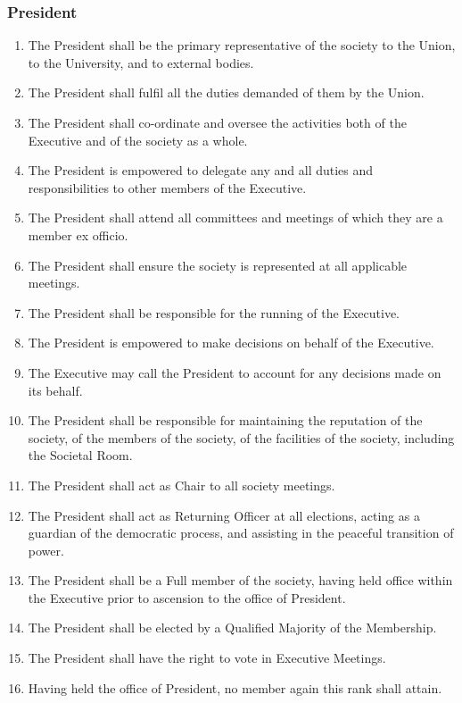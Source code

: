 \documentclass{scrartcl}
\begin{document}
            \subsubsection{President}
                \label{executive--positions--president}
                \begin{enumerate}
                    \item The President shall be the primary representative of the society to the Union, to the University, and to external bodies.
                    \item The President shall fulfil all the duties demanded of them by the Union.
                    \item The President shall co-ordinate and oversee the activities both of the Executive and of the society as a whole.
                    \item The President is empowered to delegate any and all duties and responsibilities to other members of the Executive.
                    \item The President shall attend all committees and meetings of which they are a member ex officio.
                    \item The President shall ensure the society is represented at all applicable meetings.
                    \item The President shall be responsible for the running of the Executive.
                    \item The President is empowered to make decisions on behalf of the Executive.
                    \item The Executive may call the President to account for any decisions made on its behalf.
                    \item The President shall be responsible for maintaining the reputation of the society, of the members of the society, of the facilities of the society, including the Societal Room.
                    \item The President shall act as Chair to all society meetings.
                    \item The President shall act as Returning Officer at all elections, acting as a guardian of the democratic process, and assisting in the peaceful transition of power.
                    \item The President shall be a Full member of the society, having held office within the Executive prior to ascension to the office of President.
                    \item The President shall be elected by a Qualified Majority of the Membership.
                    \item The President shall have the right to vote in Executive Meetings.
                    \item Having held the office of President, no member again this rank shall attain.
                \end{enumerate}
\end{document}
